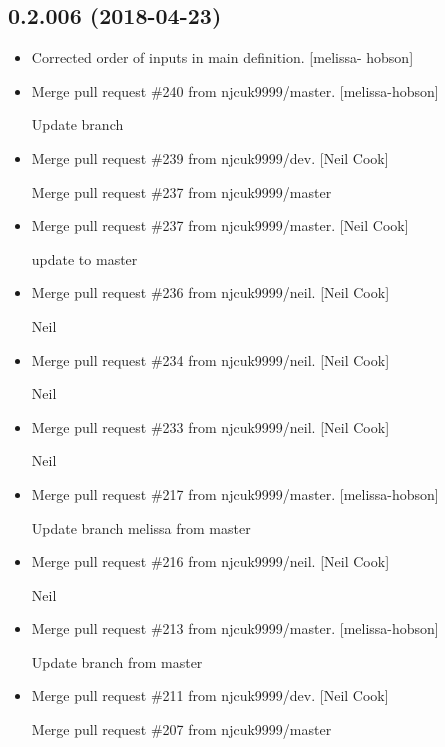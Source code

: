 \documentclass[a4paper,10pt,english]{report}
\begin{document}
\subsection{0.2.006 (2018-04-23)}
\label{\detokenize{misc/changelog:id455}}\begin{itemize}
\item {} 
Corrected order of inputs in  main definition. {[}melissa-
hobson{]}

\item {} 
Merge pull request \#240 from njcuk9999/master. {[}melissa-hobson{]}

Update branch

\item {} 
Merge pull request \#239 from njcuk9999/dev. {[}Neil Cook{]}

Merge pull request \#237 from njcuk9999/master

\item {} 
Merge pull request \#237 from njcuk9999/master. {[}Neil Cook{]}

update to master

\item {} 
Merge pull request \#236 from njcuk9999/neil. {[}Neil Cook{]}

Neil

\item {} 
Merge pull request \#234 from njcuk9999/neil. {[}Neil Cook{]}

Neil

\item {} 
Merge pull request \#233 from njcuk9999/neil. {[}Neil Cook{]}

Neil

\item {} 
Merge pull request \#217 from njcuk9999/master. {[}melissa-hobson{]}

Update branch melissa from master

\item {} 
Merge pull request \#216 from njcuk9999/neil. {[}Neil Cook{]}

Neil

\item {} 
Merge pull request \#213 from njcuk9999/master. {[}melissa-hobson{]}

Update branch from master

\item {} 
Merge pull request \#211 from njcuk9999/dev. {[}Neil Cook{]}

Merge pull request \#207 from njcuk9999/master


\end{itemize}
\end{document}
